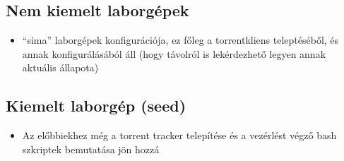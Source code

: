 %
\subsection{Nem kiemelt laborgépek}
%

\begin{itemize}
  \item ``sima'' laborgépek konfigurációja, ez főleg a torrentkliens teleptéséből, és annak konfigurálásából áll (hogy távolról is lekérdezhető legyen annak aktuális állapota)
\end{itemize}

%
\subsection{Kiemelt laborgép (seed)}
%

\begin{itemize}
  \item Az előbbiekhez még a torrent tracker telepítése és a vezérlést végző bash szkriptek bemutatása jön hozzá
\end{itemize}

